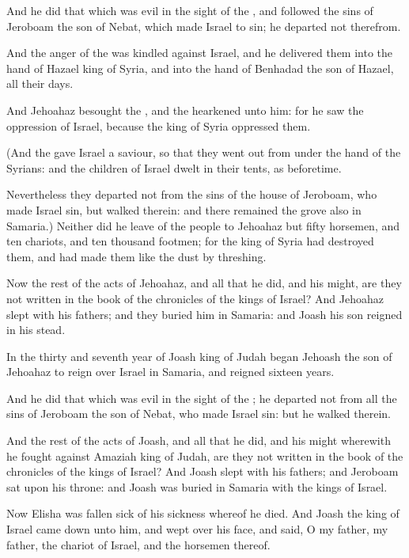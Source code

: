 \verse And he did that which was evil in the sight of the \LORD, and followed the sins of Jeroboam the son of Nebat, which made Israel to sin; he departed not therefrom.

\verse And the anger of the \LORD was kindled against Israel, and he delivered them into the hand of Hazael king of Syria, and into the hand of Benhadad the son of Hazael, all their days.

\verse And Jehoahaz besought the \LORD, and the \LORD hearkened unto him: for he saw the oppression of Israel, because the king of Syria oppressed them.

\verse (And the \LORD gave Israel a saviour, so that they went out from under the hand of the Syrians: and the children of Israel dwelt in their tents, as beforetime.

\verse Nevertheless they departed not from the sins of the house of Jeroboam, who made Israel sin, but walked therein: and there remained the grove also in Samaria.)  \verse Neither did he leave of the people to Jehoahaz but fifty horsemen, and ten chariots, and ten thousand footmen; for the king of Syria had destroyed them, and had made them like the dust by threshing.

\verse Now the rest of the acts of Jehoahaz, and all that he did, and his might, are they not written in the book of the chronicles of the kings of Israel?  \verse And Jehoahaz slept with his fathers; and they buried him in Samaria: and Joash his son reigned in his stead.

\verse In the thirty and seventh year of Joash king of Judah began Jehoash the son of Jehoahaz to reign over Israel in Samaria, and reigned sixteen years.

\verse And he did that which was evil in the sight of the \LORD; he departed not from all the sins of Jeroboam the son of Nebat, who made Israel sin: but he walked therein.

\verse And the rest of the acts of Joash, and all that he did, and his might wherewith he fought against Amaziah king of Judah, are they not written in the book of the chronicles of the kings of Israel?  \verse And Joash slept with his fathers; and Jeroboam sat upon his throne: and Joash was buried in Samaria with the kings of Israel.

\verse Now Elisha was fallen sick of his sickness whereof he died. And Joash the king of Israel came down unto him, and wept over his face, and said, O my father, my father, the chariot of Israel, and the horsemen thereof.

